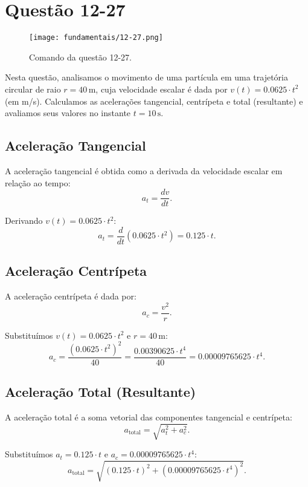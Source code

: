 \newpage
\section{Questão 12-27}

\begin{figure}[H]
	\centering
	\texttt{[image: fundamentais/12-27.png]}
	\caption{Comando da questão 12-27.}\label{fig:q12-27}
\end{figure}

Nesta questão, analisamos o movimento de uma partícula em uma trajetória circular de raio \(r = 40 \, \text{m}\), cuja velocidade escalar é dada por \(v(t) = 0.0625 \cdot t^2\) (em m/s). Calculamos as acelerações tangencial, centrípeta e total (resultante) e avaliamos seus valores no instante \(t = 10 \, \text{s}\).

\subsection*{Aceleração Tangencial}
A aceleração tangencial é obtida como a derivada da velocidade escalar em relação ao tempo:
\[
a_t = \frac{dv}{dt}.
\]

Derivando \(v(t) = 0.0625 \cdot t^2\):
\[
a_t = \frac{d}{dt}\left(0.0625 \cdot t^2\right) = 0.125 \cdot t.
\]

\subsection*{Aceleração Centrípeta}
A aceleração centrípeta é dada por:
\[
a_c = \frac{v^2}{r}.
\]

Substituímos \(v(t) = 0.0625 \cdot t^2\) e \(r = 40 \, \text{m}\):
\[
a_c = \frac{\left(0.0625 \cdot t^2\right)^2}{40} = \frac{0.00390625 \cdot t^4}{40} = 0.00009765625 \cdot t^4.
\]

\subsection*{Aceleração Total (Resultante)}
A aceleração total é a soma vetorial das componentes tangencial e centrípeta:
\[
a_{\text{total}} = \sqrt{a_t^2 + a_c^2}.
\]

Substituímos \(a_t = 0.125 \cdot t\) e \(a_c = 0.00009765625 \cdot t^4\):
\[
a_{\text{total}} = \sqrt{\left(0.125 \cdot t\right)^2 + \left(0.00009765625 \cdot t^4\right)^2}.
\]

